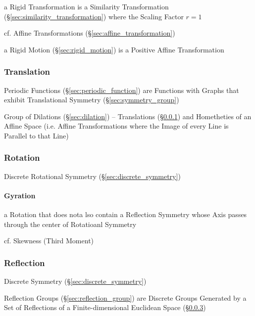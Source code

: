 a Rigid Transformation is a Similarity Transformation
(\S\ref{sec:similarity_transformation}) where the Scaling Factor $r = 1$

cf. Affine Transformations (\S\ref{sec:affine_transformation})

\fist a Rigid Motion (\S\ref{sec:rigid_motion}) is a Positive Affine
Transformation



\subsubsection{Translation}\label{sec:translation}

\fist Periodic Functions (\S\ref{sec:periodic_function}) are Functions with
Graphs that exhibit Translational Symmetry (\S\ref{sec:symmetry_group})

Group of Dilations (\S\ref{sec:dilation}) -- Translations
(\S\ref{sec:translation}) and Hometheties of an Affine Space (i.e. Affine
Transformations where the Image of every Line is Parallel to that Line)



\subsubsection{Rotation}\label{sec:rotation}

Discrete Rotational Symmetry (\S\ref{sec:discrete_symmetry})



\paragraph{Gyration}\label{sec:gyration}\hfill

a Rotation that does nota lso contain a Reflection Symmetry whose Axis passes
through the center of Rotatioanl Symmetry

cf. Skewness (Third Moment)



\subsubsection{Reflection}\label{sec:reflection}

Discrete Symmetry (\S\ref{sec:discrete_symmetry})

Reflection Groups (\S\ref{sec:reflection_group}) are Discrete Groups Generated
by a Set of Reflections of a Finite-dimensional Euclidean Space
(\S\ref{sec:reflection})

